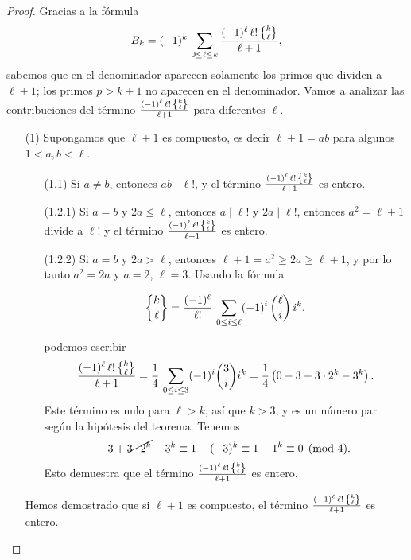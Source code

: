 \documentclass{article}
\begin{document}
\begin{proof}
Gracias a la fórmula
$$B_k = (-1)^k \, \sum_{0 \le \ell \le k} \frac{(-1)^\ell \, \ell! \, \Stirling{k}{\ell}}{\ell+1},$$
sabemos que en el denominador aparecen solamente los primos que dividen a $\ell + 1$; los primos $p > k+1$ no aparecen en el denominador. Vamos a analizar las contribuciones del término $\frac{(-1)^\ell \, \ell! \, \Stirling{k}{\ell}}{\ell+1}$ para diferentes $\ell$.

\begin{itemize}
\item[(1)] Supongamos que $\ell+1$ es compuesto, es decir $\ell+1 = ab$ para algunos $1 < a,b < \ell$.

\begin{itemize}
\item[(1.1)] Si $a\ne b$, entonces $ab \mid \ell!$, y el término $\frac{(-1)^\ell \, \ell! \, \Stirling{k}{\ell}}{\ell+1}$ es entero.

\item[(1.2.1)] Si $a = b$ y $2a \le \ell$, entonces $a \mid \ell!$ y $2a \mid \ell!$, entonces $a^2 = \ell + 1$ divide a $\ell!$ y el término $\frac{(-1)^\ell \, \ell! \, \Stirling{k}{\ell}}{\ell+1}$ es entero.

\item[(1.2.2)] Si $a = b$ y $2a > \ell$, entonces $\ell+1 = a^2 \ge 2a \ge \ell + 1$, y por lo tanto $a^2 = 2a$ y $a = 2$, $\ell = 3$. Usando la fórmula

\begin{equation}
\label{eqn:stirling-via-binomial}
\Stirling{k}{\ell} = \frac{(-1)^\ell}{\ell!}\,\sum_{0 \le i \le \ell} (-1)^i \, {\ell \choose i} \, i^k,
\end{equation}

\noindent podemos escribir
$$\frac{(-1)^\ell \, \ell! \, \Stirling{k}{\ell}}{\ell+1} = \frac{1}{4}\,\sum_{0 \le i \le 3} (-1)^i {3\choose i} i^k = \frac{1}{4} \left(0 - 3 + 3\cdot 2^k - 3^k\right).$$
Este término es nulo para $\ell > k$, así que $k > 3$, y es un número par según la hipótesis del teorema. Tenemos
$$- 3 + \cancel{3\cdot 2^k} - 3^k \equiv 1 - (-3)^k \equiv 1 - 1^k \equiv 0 \pmod{4}.$$
Esto demuestra que el término $\frac{(-1)^\ell \, \ell! \, \Stirling{k}{\ell}}{\ell+1}$ es entero.
\end{itemize}

Hemos demostrado que si $\ell+1$ es compuesto, el término $\frac{(-1)^\ell \, \ell! \, \Stirling{k}{\ell}}{\ell+1}$ es entero.


\end{itemize}
\end{proof}
\end{document}
